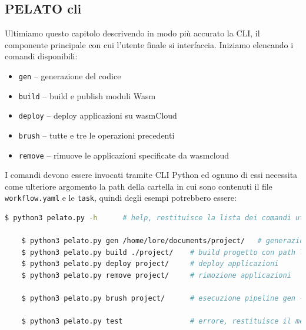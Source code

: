 \subsection{PELATO cli}

Ultimiamo questo capitolo descrivendo in modo più accurato la CLI, il componente principale con cui l'utente finale si interfaccia. Iniziamo elencando i comandi disponibili:
\begin{itemize}
    \item \texttt{gen} -- generazione del codice
    \item \texttt{build} -- build e publish moduli Wasm
    \item \texttt{deploy} -- deploy applicazioni su wasmCloud
    \item \texttt{brush} -- tutte e tre le operazioni precedenti
    \item \texttt{remove} -- rimuove le applicazioni specificate da wasmcloud
\end{itemize}

I comandi devono essere invocati tramite CLI Python ed ognuno di essi necessita come ulteriore argomento la path della cartella in cui sono contenuti il file \texttt{workflow.yaml} e le \texttt{task}, quindi degli esempi potrebbero essere:

\begin{lstlisting}[language=bash, caption={Cheatsheet comandi Pelato CLI}, captionpos=b, label={code:pelato_cli}]
    $ python3 pelato.py -h      # help, restituisce la lista dei comandi utilizzabili

    $ python3 pelato.py gen /home/lore/documents/project/   # generazione codice partendo con una path globale
    $ python3 pelato.py build ./project/    # build progetto con path locale
    $ python3 pelato.py deploy project/     # deploy applicazioni
    $ python3 pelato.py remove project/     # rimozione applicazioni 

    $ python3 pelato.py brush project/      # esecuzione pipeline gen -> build -> deploy
    
    $ python3 pelato.py test                # errore, restituisce il messaggio di help    
\end{lstlisting}
